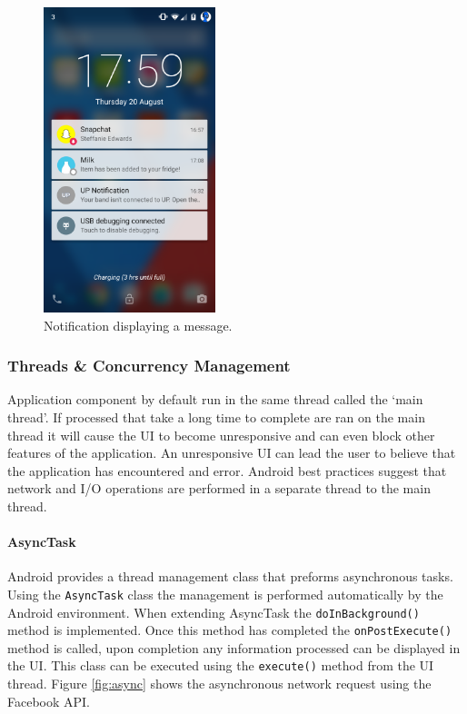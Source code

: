 \documentclass[a4paper, 11pt]{article}
\begin{document}
\begin{figure}[!htbp]
\centering
\includegraphics[width=5cm]{notification}
\caption{Notification displaying a message.} \label{fig:notification}
\end{figure}

\subsubsection{Threads \& Concurrency Management}
Application component by default run in the same thread called the `main thread'. If processed that take a long time to complete are ran on the main thread it will cause the UI to become unresponsive and can even block other features of the application. An unresponsive UI can lead the user to believe that the application has encountered and error. Android best practices suggest that network and I/O operations are performed in a separate thread to the main thread.

\paragraph{AsyncTask}Android provides a thread management class that preforms asynchronous tasks. Using the \texttt{AsyncTask} class the management is performed automatically by the Android environment. When extending  AsyncTask the \texttt{doInBackground()} method is implemented. Once this method has completed the \texttt{onPostExecute()} method is called, upon completion any information processed can be displayed in the UI. This class can be executed using the \texttt{execute()} method from the UI thread. Figure \ref{fig:async} shows the asynchronous network request using the Facebook API.
\end{document}
